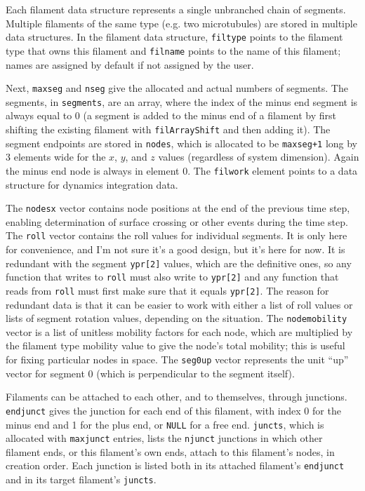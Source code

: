 \documentclass {scrbook}
\newcommand {\ttt} {\texttt}
\begin{document}
Each filament data structure represents a single unbranched chain of segments. Multiple filaments of the same type (e.g. two microtubules) are stored in multiple data structures. In the filament data structure, \ttt{filtype} points to the filament type that owns this filament and \ttt{filname} points to the name of this filament; names are assigned by default if not assigned by the user.

Next, \ttt{maxseg} and \ttt{nseg} give the allocated and actual numbers of segments. The segments, in \ttt{segments}, are an array, where the index of the minus end segment is always equal to 0 (a segment is added to the minus end of a filament by first shifting the existing filament with \ttt{filArrayShift} and then adding it). The segment endpoints are stored in \ttt{nodes}, which is allocated to be \ttt{maxseg+1} long by 3 elements wide for the $x$, $y$, and $z$ values (regardless of system dimension). Again the minus end node is always in element 0. The \ttt{filwork} element points to a data structure for dynamics integration data.

The \ttt{nodesx} vector contains node positions at the end of the previous time step, enabling determination of surface crossing or other events during the time step. The \ttt{roll} vector contains the roll values for individual segments. It is only here for convenience, and I'm not sure it's a good design, but it's here for now. It is redundant with the segment \ttt{ypr[2]} values, which are the definitive ones, so any function that writes to \ttt{roll} must also write to \ttt{ypr[2]} and any function that reads from \ttt{roll} must first make sure that it equals \ttt{ypr[2]}. The reason for redundant data is that it can be easier to work with either a list of roll values or lists of segment rotation values, depending on the situation. The \ttt{nodemobility} vector is a list of unitless mobility factors for each node, which are multiplied by the filament type mobility value to give the node's total mobility; this is useful for fixing particular nodes in space. The \ttt{seg0up} vector represents the unit ``up'' vector for segment 0 (which is perpendicular to the segment itself).

Filaments can be attached to each other, and to themselves, through junctions. \ttt{endjunct} gives the junction for each end of this filament, with index 0 for the minus end and 1 for the plus end, or \ttt{NULL} for a free end. \ttt{juncts}, which is allocated with \ttt{maxjunct} entries, lists the \ttt{njunct} junctions in which other filament ends, or this filament's own ends, attach to this filament's nodes, in creation order. Each junction is listed both in its attached filament's \ttt{endjunct} and in its target filament's \ttt{juncts}.
\end{document}
